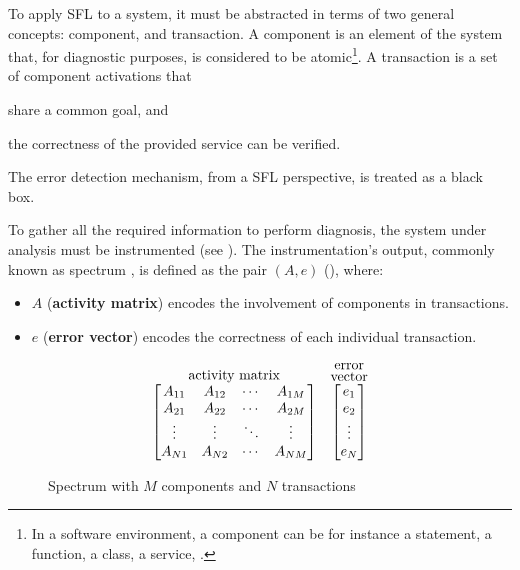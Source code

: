 To apply \ac{SFL} to a system, it must be abstracted in terms of two
general concepts: component, and transaction.
%
A component is an element of the system that, for diagnostic purposes,
is considered to be atomic\footnote{In a software environment, a
  component can be for instance a statement, a function, a class, a
  service, \etc.}.
%
A transaction is a set of component activations that
\begin{inparaenum}[(1)]
\item share a common goal, and
\item the correctness of the provided service can be verified.
\end{inparaenum}
%
The error detection mechanism, from a \ac{SFL} perspective, is treated
as a black box.

To gather all the required information to perform diagnosis, the
system under analysis must be instrumented (see
).
%
The instrumentation's output, commonly known as
spectrum \cite{Harrold98}, is defined as the
pair $(A, e)$ (), where:

\begin{itemize}
\item $A$ (\textbf{activity matrix}) encodes the involvement of
  components in transactions.
\item $e$ (\textbf{error vector}) encodes the correctness of each
  individual transaction.
\end{itemize}

\begin{figure}[!ht]
  \begin{equation*}
    \stackrel{\mbox{activity matrix}}{%
      \begin{bmatrix}
        A_{11} & A_{12} & \cdots & A_{1M} \\
        A_{21} & A_{22} & \cdots & A_{2M} \\
        \vdots & \vdots & \ddots & \vdots \\
        A_{N1} & A_{N2} & \cdots & A_{NM}
      \end{bmatrix}
    }\ \ \ \stackrel{\stackrel{\mbox{error}}{\mbox{vector}}}{%
      \begin{bmatrix}
        e_1    \\
        e_2    \\
        \vdots \\
        e_N
      \end{bmatrix}%
    }
  \end{equation*}
  \caption{Spectrum with $M$ components and $N$ transactions\label{fig:intro:sfl-matrix}}
\end{figure}

